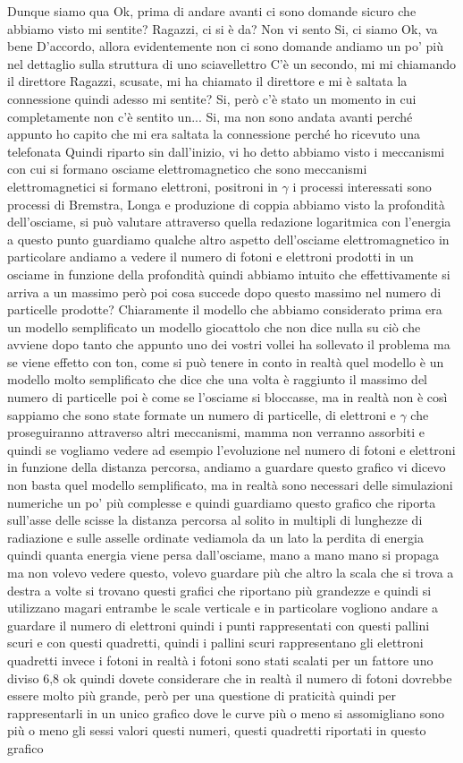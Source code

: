 {Dunque siamo qua Ok, prima di andare avanti ci sono domande sicuro che abbiamo visto mi sentite? Ragazzi, ci si è da? Non vi sento Si, ci siamo Ok, va bene D'accordo, allora evidentemente non ci sono domande andiamo un po' più nel dettaglio sulla struttura di uno sciavellettro C'è un secondo, mi mi chiamando il direttore Ragazzi, scusate, mi ha chiamato il direttore e mi è saltata la connessione quindi adesso mi sentite? Si, però c'è stato un momento in cui completamente non c'è sentito un... Si, ma non sono andata avanti perché appunto ho capito che mi era saltata la connessione perché ho ricevuto una telefonata Quindi riparto sin dall'inizio, vi ho detto abbiamo visto i meccanismi con cui si formano osciame elettromagnetico che sono meccanismi elettromagnetici si formano elettroni, positroni in $\gamma$ i processi interessati sono processi di Bremstra, Longa e produzione di coppia abbiamo visto la profondità dell'osciame, si può valutare attraverso quella redazione logaritmica con l'energia a questo punto guardiamo qualche altro aspetto dell'osciame elettromagnetico in particolare andiamo a vedere il numero di fotoni e elettroni prodotti in un osciame in funzione della profondità quindi abbiamo intuito che effettivamente si arriva a un massimo però poi cosa succede dopo questo massimo nel numero di particelle prodotte? Chiaramente il modello che abbiamo considerato prima era un modello semplificato un modello giocattolo che non dice nulla su ciò che avviene dopo tanto che appunto uno dei vostri vollei ha sollevato il problema ma se viene effetto con ton, come si può tenere in conto in realtà quel modello è un modello molto semplificato che dice che una volta è raggiunto il massimo del numero di particelle poi è come se l'osciame si bloccasse, ma in realtà non è così sappiamo che sono state formate un numero di particelle, di elettroni e $\gamma$ che proseguiranno attraverso altri meccanismi, mamma non verranno assorbiti e quindi se vogliamo vedere ad esempio l'evoluzione nel numero di fotoni e elettroni in funzione della distanza percorsa, andiamo a guardare questo grafico vi dicevo non basta quel modello semplificato, ma in realtà sono necessari delle simulazioni numeriche un po' più complesse e quindi guardiamo questo grafico che riporta sull'asse delle scisse la distanza percorsa al solito in multipli di lunghezze di radiazione e sulle asselle ordinate vediamola da un lato la perdita di energia quindi quanta energia viene persa dall'osciame, mano a mano mano si propaga ma non volevo vedere questo, volevo guardare più che altro la scala che si trova a destra a volte si trovano questi grafici che riportano più grandezze e quindi si utilizzano magari entrambe le scale verticale e in particolare vogliono andare a guardare il numero di elettroni quindi i punti rappresentati con questi pallini scuri e con questi quadretti, quindi i pallini scuri rappresentano gli elettroni quadretti invece i fotoni in realtà i fotoni sono stati scalati per un fattore uno diviso 6,8 ok quindi dovete considerare che in realtà il numero di fotoni dovrebbe essere molto più grande, però per una questione di praticità quindi per rappresentarli in un unico grafico dove le curve più o meno si assomigliano sono più o meno gli sessi valori questi numeri, questi quadretti riportati in questo grafico }
